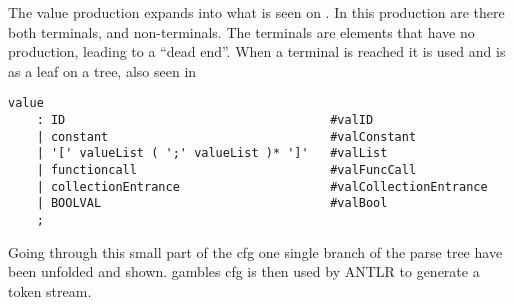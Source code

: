 The value production expands into what is seen on .
In this production are there both terminals, and non-terminals.
The terminals are elements that have no production, leading to a ``dead end''.
When a terminal is reached it is used and is as a leaf on a tree, also seen in 
\begin{lstlisting}[caption={\acrshort{cfg} Value},frame=tlrb,label={lst:value},numbers=none]
value
    : ID                                     #valID
    | constant                               #valConstant
    | '[' valueList ( ';' valueList )* ']'   #valList
    | functioncall                           #valFuncCall
    | collectionEntrance                     #valCollectionEntrance
    | BOOLVAL                                #valBool
    ;
\end{lstlisting}

Going through this small part of the \acrshort{cfg} one single branch of the parse tree have been unfolded and shown.
\gls{gamble}s \acrshort{cfg} is then used by ANTLR to generate a token stream. 